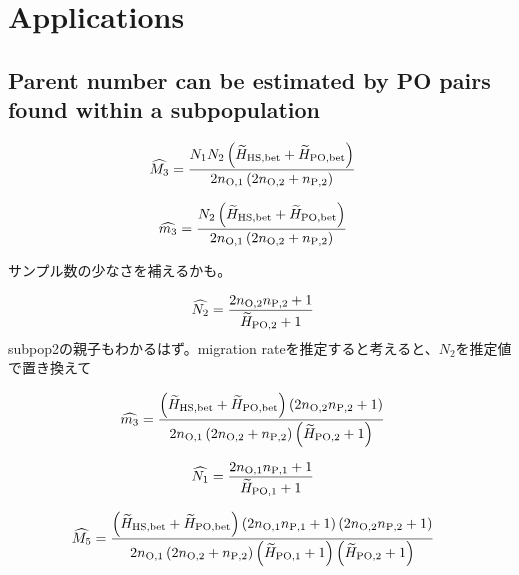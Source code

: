 \documentclass[AMA,STIX1COL]{WileyNJD-v2}
\begin{document}
\section{Applications}\label{sec3}

\subsection{Parent number can be estimated by PO pairs found within a subpopulation}

\begin{align}
\widehat{M_3} &= \frac{ N_{1} N_{2} \left(\widetilde{H}_{\rm HS,bet} + \widetilde{H}_{\rm PO,bet}\right) } {2n_{\rm O, 1} \left(2 n_{\rm O, 2} + n_{\rm P, 2}\right) }
\label{AP-1}
\end{align}

\begin{align}
\widehat{m_3} &= \frac{ N_{2} \left(\widetilde{H}_{\rm HS,bet} + \widetilde{H}_{\rm PO,bet}\right) } {2n_{\rm O, 1} \left(2 n_{\rm O, 2} + n_{\rm P, 2}\right) }
\label{AP-2}
\end{align}

サンプル数の少なさを補えるかも。

\begin{align}
\widehat{N_2} &= \frac{ 2 n_{\rm O, 2} n_{\rm P, 2} + 1 }{\widetilde{H}_{\rm PO, 2} + 1} 
\label{AP-3}
\end{align}
subpop2の親子もわかるはず。migration rateを推定すると考えると、$N_2$を推定値で置き換えて

\begin{align}
\widehat{m_3} &=  \frac{ \left(\widetilde{H}_{\rm HS,bet} + \widetilde{H}_{\rm PO,bet}\right) \left(2 n_{\rm O, 2} n_{\rm P, 2} + 1\right)} {2n_{\rm O, 1} \left(2 n_{\rm O, 2} + n_{\rm P, 2}\right) \left(\widetilde{H}_{\rm PO, 2} + 1\right)}
\label{AP-4}
\end{align}

\begin{align}
\widehat{N_1} &= \frac{ 2 n_{\rm O, 1} n_{\rm P, 1} + 1 }{\widetilde{H}_{\rm PO, 1} + 1} 
\label{AP-5}
\end{align}

\begin{align}
\widehat{M_5} &=  \frac{ \left(\widetilde{H}_{\rm HS,bet} + \widetilde{H}_{\rm PO,bet}\right) \left(2 n_{\rm O, 1} n_{\rm P, 1} + 1\right) \left(2 n_{\rm O, 2} n_{\rm P, 2} + 1\right)} {2n_{\rm O, 1} \left(2 n_{\rm O, 2} + n_{\rm P, 2}\right) \left(\widetilde{H}_{\rm PO, 1} + 1\right) \left(\widetilde{H}_{\rm PO, 2} + 1\right)}
\label{AP-6}
\end{align}
\end{document}
